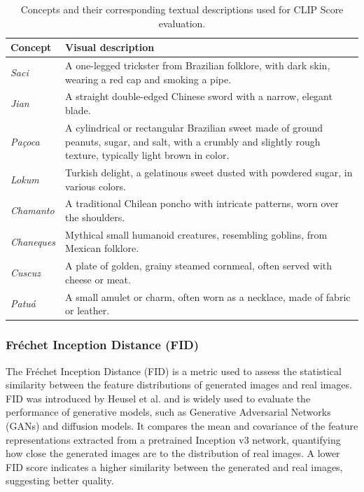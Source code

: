 \documentclass[pdflatex,sn-mathphys-num]{sn-jnl}%
\theoremstyle{thmstyleone}%
\theoremstyle{thmstyletwo}%
\theoremstyle{thmstylethree}%
\begin{document}
\begin{table}[htbp]
    \centering
    \caption{Concepts and their corresponding textual descriptions used for CLIP Score evaluation.}
    \label{tab:clip_score_prompts}
    \begin{tabular}{@{}lp{9.5cm}@{}}
        \toprule
        \textbf{Concept} & \textbf{Visual description} \\
        \midrule
        \textit{Saci} & A one-legged trickster from Brazilian folklore, with dark skin, wearing a red cap and smoking a pipe. \\
        \textit{Jian} & A straight double-edged Chinese sword with a narrow, elegant blade. \\
        \textit{Pa\c{c}oca} & A cylindrical or rectangular Brazilian sweet made of ground peanuts, sugar, and salt, with a crumbly and slightly rough texture, typically light brown in color. \\
        \textit{Lokum} & Turkish delight, a gelatinous sweet dusted with powdered sugar, in various colors. \\
        \textit{Chamanto} & A traditional Chilean poncho with intricate patterns, worn over the shoulders. \\
        \textit{Chaneques} & Mythical small humanoid creatures, resembling goblins, from Mexican folklore. \\
        \textit{Cuscuz} & A plate of golden, grainy steamed cornmeal, often served with cheese or meat. \\
        \textit{Patu\'a} & A small amulet or charm, often worn as a necklace, made of fabric or leather. \\
        \bottomrule
    \end{tabular}
\end{table}



\subsubsection{Fréchet Inception Distance (FID)}

The Fréchet Inception Distance (FID) is a metric used to assess the statistical similarity between the feature distributions of generated images and real images. FID was introduced by Heusel et al. \cite{heusel2018ganstrainedtimescaleupdate} and is widely used to evaluate the performance of generative models, such as Generative Adversarial Networks (GANs) and diffusion models. It compares the mean and covariance of the feature representations extracted from a pretrained Inception v3 network, quantifying how close the generated images are to the distribution of real images. A lower FID score indicates a higher similarity between the generated and real images, suggesting better quality.
\end{document}
